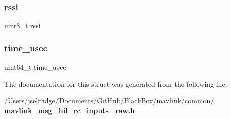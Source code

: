 \subsubsection{rssi}
{\footnotesize\ttfamily uint8\+\_\+t rssi}

\mbox{\label{struct____mavlink__hil__rc__inputs__raw__t_a2db60704c293664dcb6159b55c98c2f2}} 
\subsubsection{time\+\_\+usec}
{\footnotesize\ttfamily uint64\+\_\+t time\+\_\+usec}



The documentation for this struct was generated from the following file\+:\begin{DoxyCompactItemize}
\item 
/\+Users/jselfridge/\+Documents/\+Git\+Hub/\+Black\+Box/mavlink/common/\textbf{ mavlink\+\_\+msg\+\_\+hil\+\_\+rc\+\_\+inputs\+\_\+raw.\+h}\end{DoxyCompactItemize}
